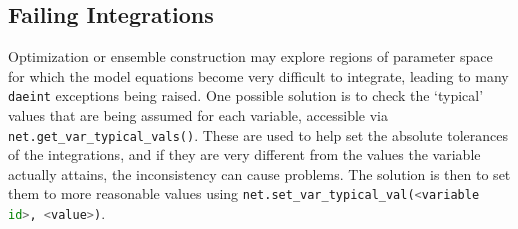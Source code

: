 \documentclass[12pt]{article}
\makeatletter
\newcommand{\py}[1]{\lstinline[language=Python, showstringspaces=False]@#1@}
\makeatother
\begin{document}
\subsection{Failing Integrations}
Optimization or ensemble construction may explore regions of parameter space for which the model equations become very difficult to integrate, leading to many \py{daeint} exceptions being raised.
One possible solution is to check the `typical' values that are being assumed for each variable, accessible via \py{net.get_var_typical_vals()}.
These are used to help set the absolute tolerances of the integrations, and if they are very different from the values the variable actually attains, the inconsistency can cause problems.
The solution is then to set them to more reasonable values using \py{net.set_var_typical_val(<variable id>, <value>)}.



\end{document}
